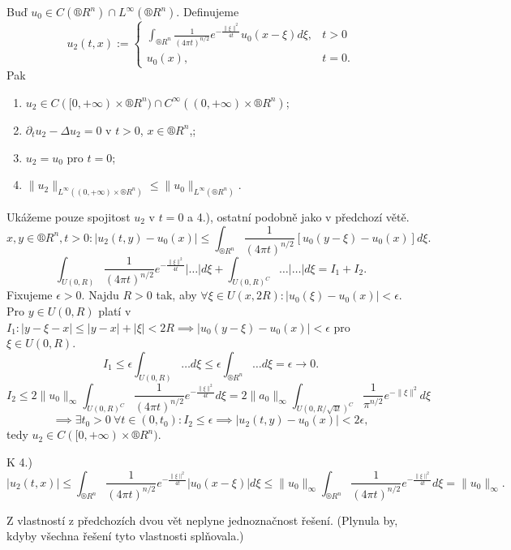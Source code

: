 \documentclass[12pt]{article}					%
\begin{document}
\begin{veta}
	Buď $u_0 \in C(®R^n) \cap L^∞(®R^n)$. Definujeme
	$$ u_2(t, x) := \begin{cases}\int_{®R^n} \frac{1}{(4\pi t)^{n / 2}} e^{- \frac{\|\xi\|^2}{4t}} u_0(x - \xi) d\xi, & t > 0\\ u_0(x), & t = 0.\end{cases} $$
	Pak
	\begin{enumerate}
		\item $u_2 \in C([0, +∞) \times ®R^n) \cap C^∞((0, +∞) \times ®R^n)$;
		\item $\partial_t u_2 - \Delta u_2 = 0$ v $t > 0$, $x \in ®R^n$,;
		\item $u_2 = u_0$ pro $t = 0$;
		\item $\|u_2\|_{L^∞((0, +∞) \times ®R^n)} ≤ \|u_0\|_{L^∞(®R^n)}$.
	\end{enumerate}

	\begin{dukazin}
		Ukážeme pouze spojitost $u_2$ v $t = 0$ a 4.), ostatní podobně jako v předchozí větě. 
		$$ x, y \in ®R^n, t > 0: |u_2(t,y) - u_0(x)| ≤ \int_{®R^n} \frac{1}{(4\pi t)^{n / 2}} [u_0(y - \xi) - u_0(x)] d\xi. $$
		$$ \int_{U(0, R)} \frac{1}{(4\pi t)^{n / 2}} e^{-\frac{\|\xi\|^2}{4t}} |…| d\xi + \int_{U(0, R)^C} … | … | d\xi = I_1 + I_2. $$
		Fixujeme $\epsilon > 0$. Najdu $R > 0$ tak, aby $\forall \xi \in U(x, 2R): |u_0(\xi) - u_0(x)| < \epsilon$. Pro $y \in U(0, R)$ platí v $I_1: |y - \xi - x| ≤ |y - x| + |\xi| < 2R \implies |u_0(y - \xi) - u_0(x)| < \epsilon$ pro $\xi \in U(0, R)$.
		$$ I_1 ≤ \epsilon \int_{U(0, R)} … d\xi ≤ \epsilon \int_{®R^n} … d\xi = \epsilon \rightarrow 0. $$
		$$ I_2 ≤ 2 \|u_0\|_∞ \int_{U(0, R)^C} \frac{1}{(4 \pi t)^{n / 2}} e^{- \frac{\|\xi\|^2}{4t}} d\xi = 2 \|a_0\|_∞ \int_{U(0, R / \sqrt{4t})^C} \frac{1}{\pi^{n / 2}} e^{-\|\xi\|^2} d\xi $$
		$$ \implies \exists t_0 > 0\ \forall t \in (0, t_0): I_2 ≤ \epsilon \implies |u_2(t, y) - u_0(x)| < 2\epsilon, $$
		tedy $u_2 \in C([0, +∞) \times ®R^n)$.

		K 4.)
		$$ |u_2(t, x)| ≤ \int_{®R^n} \frac{1}{(4 \pi t)^{n / 2}} e^{- \frac{\|\xi\|^2}{4t}} |u_0(x - \xi)| d \xi ≤ \|u_0\|_∞ \int_{®R^n} \frac{1}{(4\pi t)^{n / 2}} e^{- \frac{\|\xi\|^2}{4t}} d\xi = \|u_0\|_∞. $$
	\end{dukazin}
\end{veta}

\begin{upozorneni}
	Z vlastností z předchozích dvou vět neplyne jednoznačnost řešení. (Plynula by, kdyby všechna řešení tyto vlastnosti splňovala.)
\end{upozorneni}
\end{document}
